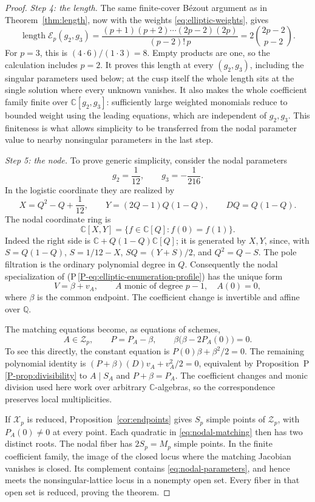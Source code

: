 \documentclass[11pt]{article}
\newcommand{\CC}{\mathbb C}
\newcommand{\QQ}{\mathbb Q}
\newcommand{\len}{\operatorname{length}}
\newcommand{\Xp}{\mathcal X_p}
\numberwithin{equation}{section}
\begin{document}
\begin{proof}
\emph{Step 4: the length.}
The same finite-cover B\'ezout argument as in
Theorem~\ref{thm:length}, now with the weights
\eqref{eq:elliptic-weights}, gives
\[
 \len\mathcal E_p(g_2,g_3)
 =\frac{(p+1)(p+2)\cdots(2p-2)(2p)}{(p-2)!\,p}
 =2\binom{2p-2}{p-2}.
\]
For \(p=3\), this is \((4\cdot6)/(1\cdot3)=8\).
Empty products are one, so the calculation includes \(p=2\).
It proves this length at every \((g_2,g_3)\), including the
singular parameters used below; at the cusp itself the whole length
sits at the single solution where every unknown vanishes.
It also makes the whole coefficient family finite over
\(\CC[g_2,g_3]\): sufficiently large weighted monomials reduce
to bounded weight using the leading equations, which are
independent of \(g_2,g_3\). This finiteness is what allows
simplicity to be transferred from the nodal parameter value to nearby
nonsingular parameters in the last step.

\emph{Step 5: the node.}
To prove generic simplicity, consider the nodal parameters
\begin{equation}\label{eq:nodal-parameters}
 g_2=\frac1{12},\qquad g_3=-\frac1{216}.
\end{equation}
In the logistic coordinate they are realized by
\[
 X=Q^2-Q+\frac1{12},\qquad
 Y=(2Q-1)Q(1-Q),\qquad DQ=Q(1-Q).
\]
The nodal coordinate ring is
\[
 \CC[X,Y]=\{f\in\CC[Q]:f(0)=f(1)\}.
\]
Indeed the right side is
\(\CC+Q(1-Q)\CC[Q]\); it is generated by \(X,Y\), since,
with \(S=Q(1-Q)\),
\(S=1/12-X\), \(SQ=(Y+S)/2\), and \(Q^2=Q-S\).
The pole filtration is the ordinary polynomial degree in \(Q\).
Consequently the nodal specialization of
(P\,\ref{P-eq:elliptic-enumeration-profile}) has the unique form
\[
 V=\beta+v_A,\qquad A\text{ monic of degree }p-1,\quad A(0)=0,
\]
where \(\beta\) is the common endpoint.
The coefficient change is invertible and affine over \(\QQ\).

The matching equations become, as equations of schemes,
\begin{equation}\label{eq:nodal-matching}
 A\in\mathcal Z_p,\qquad
 P=P_A-\beta,\qquad
 \beta\bigl(\beta-2P_A(0)\bigr)=0.
\end{equation}
To see this directly, the constant equation is
\(P(0)\beta+\beta^2/2=0\).
The remaining polynomial identity is
\((P+\beta)(D)v_A+v_A^2/2=0\), equivalent by
Proposition~P\,\ref{P-prop:divisibility} to \(A\mid S_A\) and
\(P+\beta=P_A\).
The coefficient changes and monic division used here work over
arbitrary \(\CC\)-algebras, so the correspondence preserves
local multiplicities.

If \(\Xp\) is reduced, Proposition~\ref{cor:endpoints} gives
\(S_p\) simple points of \(\mathcal Z_p\), with
\(P_A(0)\ne0\) at every point.
Each quadratic in \eqref{eq:nodal-matching} then has two
distinct roots. The nodal fiber has \(2S_p=M_p\) simple points.
In the finite coefficient family, the image of the closed locus
where the matching Jacobian vanishes is closed.
Its complement contains \eqref{eq:nodal-parameters}, and hence
meets the nonsingular-lattice locus in a nonempty open set.
Every fiber in that open set is reduced, proving the theorem.
\end{proof}
\end{document}
